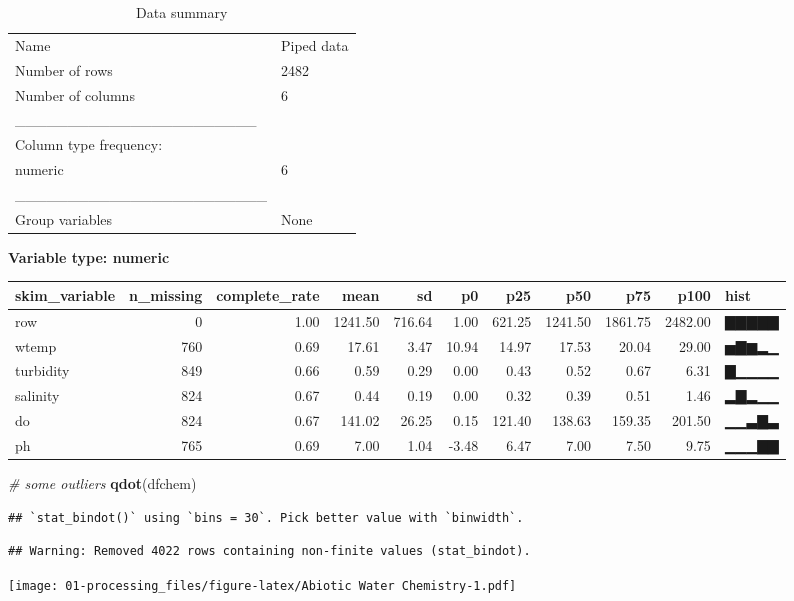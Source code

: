\documentclass[]{article}
\newenvironment{Shaded}{\begin{snugshade}}{\end{snugshade}}
\newcommand{\CommentTok}[1]{\textcolor[rgb]{0.56,0.35,0.01}{\textit{#1}}}
\newcommand{\KeywordTok}[1]{\textcolor[rgb]{0.13,0.29,0.53}{\textbf{#1}}}
\newcommand{\NormalTok}[1]{#1}
\begin{document}
\begin{longtable}[]{@{}ll@{}}
\caption{Data summary}\tabularnewline
\toprule
\endhead
Name & Piped data\tabularnewline
Number of rows & 2482\tabularnewline
Number of columns & 6\tabularnewline
\_\_\_\_\_\_\_\_\_\_\_\_\_\_\_\_\_\_\_\_\_\_\_ &\tabularnewline
Column type frequency: &\tabularnewline
numeric & 6\tabularnewline
\_\_\_\_\_\_\_\_\_\_\_\_\_\_\_\_\_\_\_\_\_\_\_\_ &\tabularnewline
Group variables & None\tabularnewline
\bottomrule
\end{longtable}

\textbf{Variable type: numeric}

\begin{longtable}[]{@{}lrrrrrrrrrl@{}}
\toprule
skim\_variable & n\_missing & complete\_rate & mean & sd & p0 & p25 &
p50 & p75 & p100 & hist\tabularnewline
\midrule
\endhead
row & 0 & 1.00 & 1241.50 & 716.64 & 1.00 & 621.25 & 1241.50 & 1861.75 &
2482.00 & ▇▇▇▇▇\tabularnewline
wtemp & 760 & 0.69 & 17.61 & 3.47 & 10.94 & 14.97 & 17.53 & 20.04 &
29.00 & ▅▇▆▂▁\tabularnewline
turbidity & 849 & 0.66 & 0.59 & 0.29 & 0.00 & 0.43 & 0.52 & 0.67 & 6.31
& ▇▁▁▁▁\tabularnewline
salinity & 824 & 0.67 & 0.44 & 0.19 & 0.00 & 0.32 & 0.39 & 0.51 & 1.46 &
▂▇▂▁▁\tabularnewline
do & 824 & 0.67 & 141.02 & 26.25 & 0.15 & 121.40 & 138.63 & 159.35 &
201.50 & ▁▁▃▇▃\tabularnewline
ph & 765 & 0.69 & 7.00 & 1.04 & -3.48 & 6.47 & 7.00 & 7.50 & 9.75 &
▁▁▁▇▇\tabularnewline
\bottomrule
\end{longtable}

\begin{Shaded}
\begin{Highlighting}[]
\CommentTok{# some outliers}
\KeywordTok{qdot}\NormalTok{(dfchem)}
\end{Highlighting}
\end{Shaded}

\begin{verbatim}
## `stat_bindot()` using `bins = 30`. Pick better value with `binwidth`.
\end{verbatim}

\begin{verbatim}
## Warning: Removed 4022 rows containing non-finite values (stat_bindot).
\end{verbatim}

\texttt{[image: 01-processing\_files/figure-latex/Abiotic Water Chemistry-1.pdf]}
\end{document}
